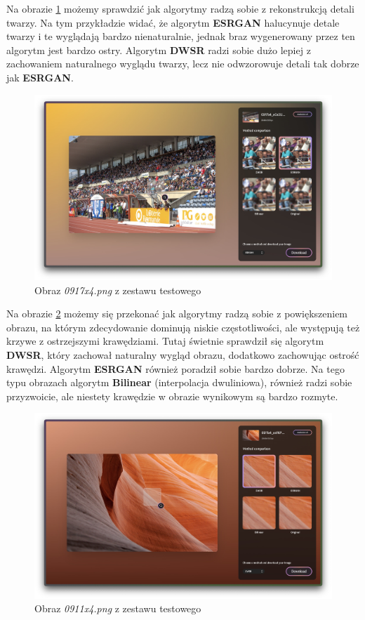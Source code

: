 Na obrazie \ref{fig:image101} możemy sprawdzić jak algorytmy radzą sobie z rekonstrukcją detali twarzy. Na tym przykładzie widać, że algorytm \textbf{ESRGAN} halucynuje detale twarzy i te wyglądają bardzo nienaturalnie, jednak braz wygenerowany przez ten algorytm jest bardzo ostry. Algorytm \textbf{DWSR} radzi sobie dużo lepiej z zachowaniem naturalnego wyglądu twarzy, lecz nie odwzorowuje detali tak dobrze jak \textbf{ESRGAN}.

\begin{figure}[ht]
    \centering
    \includegraphics[width=0.9\linewidth]{Rozdziały/05.Porownanie_algorytmow/Obrazy/Zrzut ekranu 2023-12-12 o 14.11.49.jpg}  
    \caption{Obraz \textit{0917x4.png} z zestawu testowego \cite{guo2017deep}}
    \label{fig:image101}
\end{figure}

Na obrazie \ref{fig:image102} możemy się przekonać jak algorytmy radzą sobie z powiększeniem obrazu, na którym zdecydowanie dominują niskie częstotliwości, ale występują też krzywe z ostrzejszymi krawędziami. Tutaj świetnie sprawdził się algorytm \textbf{DWSR}, który zachował naturalny wygląd obrazu, dodatkowo zachowując ostrość krawędzi. Algorytm \textbf{ESRGAN} również poradził sobie bardzo dobrze. Na tego typu obrazach algorytm \textbf{Bilinear} (interpolacja dwuliniowa), również radzi sobie przyzwoicie, ale niestety krawędzie w obrazie wynikowym są bardzo rozmyte.

\begin{figure}[H]
    \centering
    \includegraphics[width=0.9\linewidth]{Rozdziały/05.Porownanie_algorytmow/Obrazy/Zrzut ekranu 2023-12-12 o 14.12.47.jpg}  
    \caption{Obraz \textit{0911x4.png} z zestawu testowego \cite{guo2017deep}}
    \label{fig:image102}
\end{figure}


